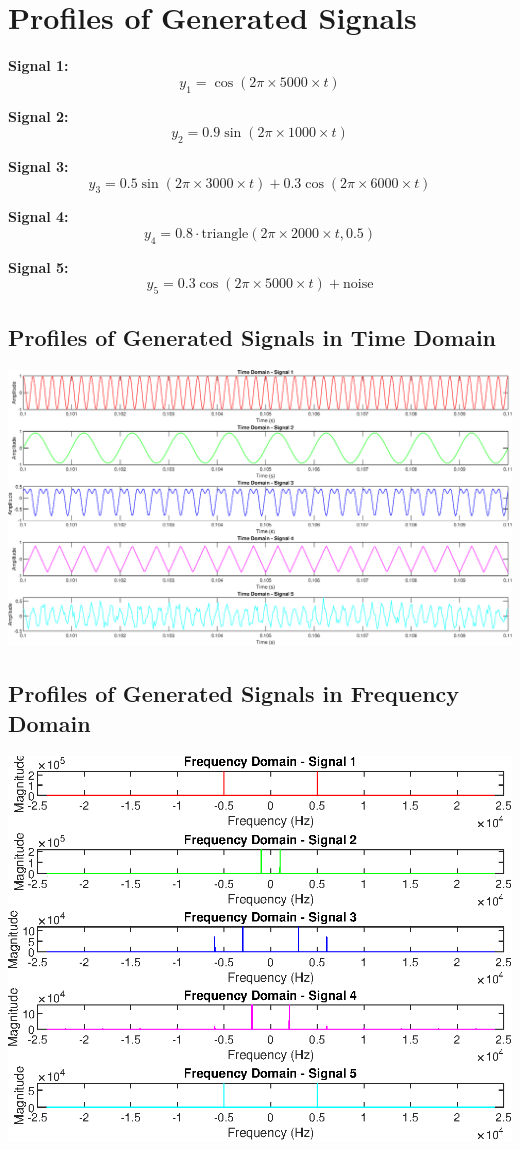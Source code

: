 \documentclass{report}
\begin{document}
     
\section{Profiles of Generated Signals }

\hspace{0.4cm}
{
\textbf{Signal 1:}
\[ y_1 = \cos(2\pi \times 5000 \times t) \]

\textbf{Signal 2:}
\[ y_2 = 0.9 \sin(2\pi \times 1000 \times t) \]

\textbf{Signal 3:}
\[ y_3 = 0.5 \sin(2\pi \times 3000 \times t) + 0.3 \cos(2\pi \times 6000 \times t) \]

\textbf{Signal 4:}
\[ y_4 = 0.8 \cdot \text{triangle}(2 \pi \times 2000 \times t, 0.5) \]

\textbf{Signal 5:}
\[ y_5 = 0.3 \cos(2\pi \times 5000 \times t) + \text{noise} \]
}



\subsection{Profiles of Generated Signals in Time Domain}
\includegraphics[width=1\linewidth]{Time_Domain_Signals.eps}


\subsection{Profiles of Generated Signals in Frequency Domain}
\includegraphics[width=1\linewidth]{Frequency_Domain_Signals.eps}
\end{document}
